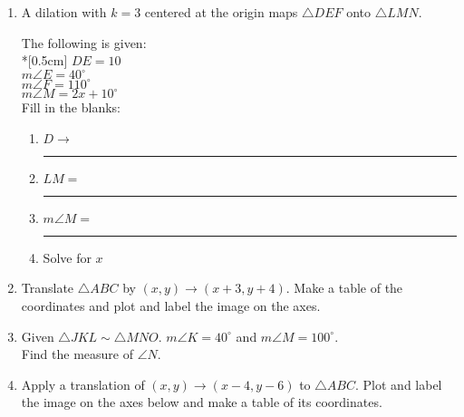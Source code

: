 \documentclass[12pt, twoside]{article}
\begin{document}
\begin{enumerate}
\newpage
  \item A dilation with $k=3$ centered at the origin maps $\triangle DEF$ onto $\triangle LMN$. \vspace{0.5cm}
  \begin{multicols}{2}
    The following is given:\\*[0.5cm]
    $DE=10$ \\
    $m\angle E = 40^\circ$ \\
    $m\angle F = 110^\circ$ \\
    $m\angle M = 2x + 10^\circ$ \\
    Fill in the blanks:
    \begin{enumerate}
      \item $D \rightarrow$ \rule{2cm}{0.15mm}
      \item $LM =$ \rule{2cm}{0.15mm}
      \item $m\angle M =$ \rule{2cm}{0.15mm}
      \item Solve for $x$
    \end{enumerate}
  \end{multicols}  \vspace{2cm}

  \item Translate $\triangle ABC$ by $(x,y) \rightarrow (x+3, y+4)$. Make a table of the coordinates and plot and label the image on the axes.
  \begin{flushright}
  \end{flushright}

  \item Given $\triangle JKL \sim \triangle MNO$. $m\angle K = 40^\circ$ and $m\angle M = 100^\circ$.\\
  Find the measure of $\angle N$. \vspace{3cm}

\newpage
\item Apply a translation of $(x,y) \rightarrow (x-4, y-6)$ to $\triangle ABC$. Plot and label the image on the axes below and make a table of its coordinates.
\begin{flushright}
\end{flushright}


\end{enumerate}
\end{document}
